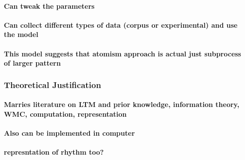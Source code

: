 \documentclass[]{book}
\let\oldparagraph\paragraph
\renewcommand{\paragraph}[1]{\oldparagraph{#1}\mbox{}}
\theoremstyle{definition}
\theoremstyle{definition}
\theoremstyle{definition}
\theoremstyle{remark}
\begin{document}
\hypertarget{can-tweak-the-parameters}{%
\paragraph{Can tweak the parameters}\label{can-tweak-the-parameters}}

\hypertarget{can-collect-different-types-of-data-corpus-or-experimental-and-use-the-model}{%
\paragraph{Can collect different types of data (corpus or experimental)
and use the
model}\label{can-collect-different-types-of-data-corpus-or-experimental-and-use-the-model}}

\hypertarget{this-model-suggests-that-atomism-approach-is-actual-just-subprocess-of-larger-pattern}{%
\paragraph{This model suggests that atomism approach is actual just
subprocess of larger
pattern}\label{this-model-suggests-that-atomism-approach-is-actual-just-subprocess-of-larger-pattern}}

\hypertarget{theoretical-justification}{%
\subsubsection{Theoretical
Justification}\label{theoretical-justification}}

\hypertarget{marries-literature-on-ltm-and-prior-knowledge-information-theory-wmc-computation-representation}{%
\paragraph{Marries literature on LTM and prior knowledge, information
theory, WMC, computation,
representation}\label{marries-literature-on-ltm-and-prior-knowledge-information-theory-wmc-computation-representation}}

\hypertarget{also-can-be-implemented-in-computer}{%
\paragraph{Also can be implemented in
computer}\label{also-can-be-implemented-in-computer}}

\hypertarget{represntation-of-rhythm-too}{%
\paragraph{represntation of rhythm
too?}\label{represntation-of-rhythm-too}}
\end{document}
